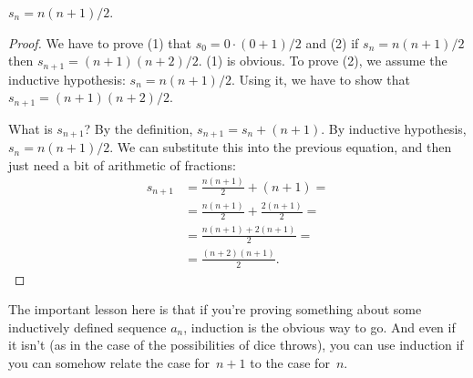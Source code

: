 \documentclass[../../../include/open-logic-section]{subfiles}
\begin{document}
\begin{prop}
  $s_n = n(n+1)/2$.
\end{prop}

\begin{proof}
  We have to prove (1) that $s_0 = 0\cdot(0 + 1)/2$ and (2) if $s_n =
  n(n+1)/2$ then $s_{n+1} = (n+1)(n+2)/2$.  (1) is obvious. To prove
  (2), we assume the inductive hypothesis: $s_n = n(n+1)/2$. Using it,
  we have to show that $s_{n+1} = (n+1)(n+2)/2$.

  What is $s_{n+1}$?  By the definition, $s_{n+1} = s_n + (n+1)$.  By
  inductive hypothesis, $s_n = n(n+1)/2$. We can substitute this into
  the previous equation, and then just need a bit of arithmetic of
  fractions:
  \begin{align*}
    s_{n+1} & = \frac{n(n+1)}{2} + (n+1) = {}\\
    & = \frac{n(n+1)}{2} + \frac{2(n+1)}{2} = {}\\
    & = \frac{n(n+1) + 2(n+1)}{2} = {}\\
    & = \frac{(n+2)(n+1)}{2}.
  \end{align*}
\end{proof}

The important lesson here is that if you're proving something about
some inductively defined sequence $a_n$, induction is the obvious way
to go. And even if it isn't (as in the case of the possibilities of
dice throws), you can use induction if you can somehow relate the case
for~$n+1$ to the case for~$n$.
\end{document}
